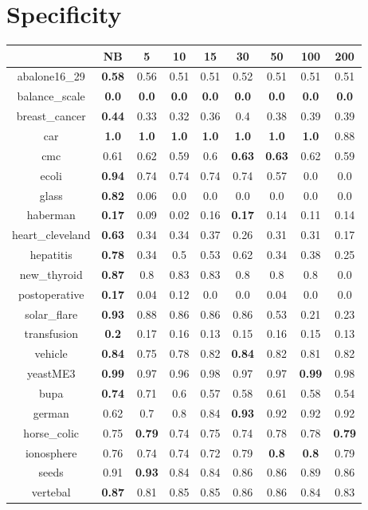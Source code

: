 \documentclass{article}%
\begin{document}
%
\section*{Specificity}%
\begin{tabular}{c|cccccccc}%
\hline%
&NB&5&10&15&30&50&100&200\\%
\hline%
abalone16\_29&\textbf{0.58}&0.56&0.51&0.51&0.52&0.51&0.51&0.51\\%
\hline%
balance\_scale&\textbf{0.0}&\textbf{0.0}&\textbf{0.0}&\textbf{0.0}&\textbf{0.0}&\textbf{0.0}&\textbf{0.0}&\textbf{0.0}\\%
\hline%
breast\_cancer&\textbf{0.44}&0.33&0.32&0.36&0.4&0.38&0.39&0.39\\%
\hline%
car&\textbf{1.0}&\textbf{1.0}&\textbf{1.0}&\textbf{1.0}&\textbf{1.0}&\textbf{1.0}&\textbf{1.0}&0.88\\%
\hline%
cmc&0.61&0.62&0.59&0.6&\textbf{0.63}&\textbf{0.63}&0.62&0.59\\%
\hline%
ecoli&\textbf{0.94}&0.74&0.74&0.74&0.74&0.57&0.0&0.0\\%
\hline%
glass&\textbf{0.82}&0.06&0.0&0.0&0.0&0.0&0.0&0.0\\%
\hline%
haberman&\textbf{0.17}&0.09&0.02&0.16&\textbf{0.17}&0.14&0.11&0.14\\%
\hline%
heart\_cleveland&\textbf{0.63}&0.34&0.34&0.37&0.26&0.31&0.31&0.17\\%
\hline%
hepatitis&\textbf{0.78}&0.34&0.5&0.53&0.62&0.34&0.38&0.25\\%
\hline%
new\_thyroid&\textbf{0.87}&0.8&0.83&0.83&0.8&0.8&0.8&0.0\\%
\hline%
postoperative&\textbf{0.17}&0.04&0.12&0.0&0.0&0.04&0.0&0.0\\%
\hline%
solar\_flare&\textbf{0.93}&0.88&0.86&0.86&0.86&0.53&0.21&0.23\\%
\hline%
transfusion&\textbf{0.2}&0.17&0.16&0.13&0.15&0.16&0.15&0.13\\%
\hline%
vehicle&\textbf{0.84}&0.75&0.78&0.82&\textbf{0.84}&0.82&0.81&0.82\\%
\hline%
yeastME3&\textbf{0.99}&0.97&0.96&0.98&0.97&0.97&\textbf{0.99}&0.98\\%
\hline%
bupa&\textbf{0.74}&0.71&0.6&0.57&0.58&0.61&0.58&0.54\\%
\hline%
german&0.62&0.7&0.8&0.84&\textbf{0.93}&0.92&0.92&0.92\\%
\hline%
horse\_colic&0.75&\textbf{0.79}&0.74&0.75&0.74&0.78&0.78&\textbf{0.79}\\%
\hline%
ionosphere&0.76&0.74&0.74&0.72&0.79&\textbf{0.8}&\textbf{0.8}&0.79\\%
\hline%
seeds&0.91&\textbf{0.93}&0.84&0.84&0.86&0.86&0.89&0.86\\%
\hline%
vertebal&\textbf{0.87}&0.81&0.85&0.85&0.86&0.86&0.84&0.83\\%
\hline%
\end{tabular}
\end{document}

